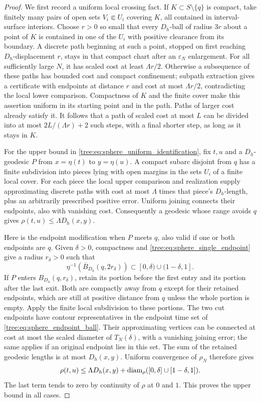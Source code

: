 \begin{proof}
We first record a uniform local crossing fact.  If $K\subset S\setminus\{q\}$
is compact, take finitely many pairs of open sets $V_i\Subset U_i$
covering $K$, all contained in interval-surface interiors.  Choose
$r>0$ so small that every $D_h$-ball of radius $3r$ about a point of $K$
is contained in one of the $U_i$ with positive clearance from its
boundary.  A discrete path beginning at such a point, stopped on first
reaching $D_h$-displacement $r$, stays in that compact chart after an
$\varepsilon_N$ enlargement.  For all sufficiently large $N$, it has
scaled cost at least $\Lambda r/2$.  Otherwise a subsequence of these
paths has bounded cost and compact confinement; subpath extraction
gives a certificate with endpoints at distance $r$ and cost at most
$\Lambda r/2$, contradicting the local lower comparison.  Compactness
of $K$ and the finite cover make this assertion uniform in its starting
point and in the path.  Paths of larger cost already satisfy it.
It follows that a path of scaled cost at most $L$ can be divided into
at most $2L/(\Lambda r)+2$ such steps, with a final shorter step, as
long as it stays in $K$.

For the upper bound in \eqref{tree:eq:sphere_uniform_identification}, fix
$t,u$ and a $D_h$-geodesic $P$ from $x=\eta(t)$ to $y=\eta(u)$.
A compact subarc disjoint from $q$ has a finite subdivision into pieces
lying with open margins in the sets $U_i$ of a finite local cover.
For each piece the local upper comparison and realization supply
approximating discrete paths with cost at most $\Lambda$ times that
piece's $D_h$-length, plus an arbitrarily prescribed positive error.
Uniform joining connects their endpoints, also with vanishing cost.
Consequently a geodesic whose range avoids $q$ gives
$\rho(t,u)\leq\Lambda D_h(x,y)$.

Here is the endpoint modification when $P$ meets $q$, also valid if one
or both endpoints are $q$.  Given $\delta>0$, compactness and
\eqref{tree:eq:sphere_single_endpoint} give a radius $r_\delta>0$ such that
\begin{equation}\label{tree:eq:sphere_endpoint_ball}
 \eta^{-1}(\overline B_{D_h}(q,2r_\delta))
                         \subset[0,\delta)\cup(1-\delta,1].
\end{equation}
If $P$ enters $B_{D_h}(q,r_\delta)$, retain its portion before the first
entry and its portion after the last exit.  Both are compactly away
from $q$ except for their retained endpoints, which are still at
positive distance from $q$ unless the whole portion is empty.  Apply
the finite local subdivision to these portions.  The two cut endpoints
have contour representatives in the endpoint time set of
\eqref{tree:eq:sphere_endpoint_ball}.  Their approximating vertices can
be connected at cost at most the scaled diameter of $T_N(\delta)$,
with a vanishing joining error; the same applies if an original endpoint
lies in this set.  The sum of the retained geodesic lengths is at most
$D_h(x,y)$.  Uniform convergence of $\rho_N$ therefore gives
\[
 \rho(t,u)\leq\Lambda D_h(x,y)+
       \operatorname{diam}_\rho([0,\delta]\cup[1-\delta,1]).
\]
The last term tends to zero by continuity of $\rho$ at $0$ and $1$.
This proves the upper bound in all cases.


\end{proof}
